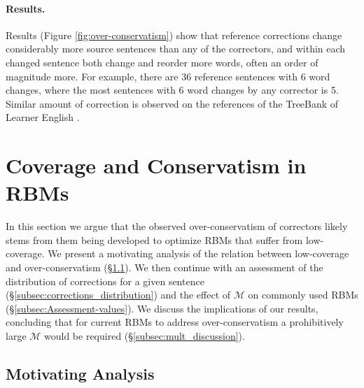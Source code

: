 \documentclass[letterpaper, 11pt]{article}
\begin{document}
\paragraph{Results.}
Results (Figure \ref{fig:over-conservatism}) show that reference corrections change considerably more source sentences than any of the correctors, and within each changed sentence both change and reorder more words, often an order of magnitude more. For example, there are  36 reference sentences with 6 word changes, where the most sentences with 6 word changes by any corrector is 5.
Similar amount of correction is observed on the references of the TreeBank of Learner English \cite{yannakoudakis2011new}.
%
%
\vspace{-.1cm}
\section{Coverage and Conservatism in RBMs}\label{sec:increase-reference}
%
In this section we argue that the observed over-conservatism of correctors likely stems
from them being developed to optimize RBMs that suffer from low-coverage.
We present a motivating analysis of the relation between low-coverage and over-conservatism (\S \ref{subsec:motivating_analysis}). We then continue with an assessment of the distribution of corrections for a given sentence (\S \ref{subsec:corrections_distribution})
and the effect of $\mathcal{M}$ on commonly used RBMs (\S \ref{subsec:Assessment-values}).
We discuss the implications of our results, concluding that for current RBMs  
to address over-conservatism a prohibitively large $\mathcal{M}$ would be required (\S \ref{subsec:mult_discussion}).

\subsection{Motivating Analysis}\label{subsec:motivating_analysis}
\end{document}
